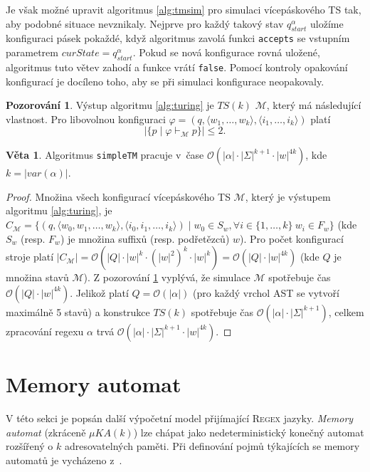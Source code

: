 \documentclass[thesis=B,czech]{FITthesis}[2019/12/23]
\theoremstyle{definition}
\newtheorem{theorem}{Věta}[chapter]
\newtheorem{pozorovani}{Pozorování}[chapter]
\begin{document}
Je však možné upravit algoritmus \ref{alg:tmsim} pro simulaci vícepáskového TS tak, aby podobné situace nevznikaly. Nejprve pro každý takový stav $q_{start}^\alpha$ uložíme konfiguraci pásek pokaždé, když algoritmus zavolá funkci \texttt{accepts} se vstupním parametrem $curState = q_{start}^\alpha$. Pokud se nová konfigurace rovná uložené, algoritmus tuto větev zahodí a funkce vrátí \texttt{false}. Pomocí kontroly opakování konfigurací je docíleno toho, aby se při simulaci konfigurace neopakovaly.  
\begin{pozorovani}\label{poz:out}Výstup algoritmu \ref{alg:turing} je $TS(k)$ $\mathcal{M}$, který má následující vlastnost. Pro libovolnou konfiguraci $\varphi = \left(q, \langle w_1, \dots, w_k\rangle,  \langle i_1, \dots, i_k\rangle\right)$ platí $$|\{p  \mid \varphi \vdash_\mathcal{M} p\}|\le2.$$
\end{pozorovani}
\begin{theorem}Algoritmus \texttt{simpleTM} pracuje v~čase $\mathcal{O}(|\alpha|\cdot|\Sigma|^{k+1}\cdot|w|^{4k})$, kde $k = |var(\alpha)|$. \end{theorem}
\begin{proof}
Množina všech konfigurací vícepáskového TS $\mathcal{M}$, který je výstupem algoritmu \ref{alg:turing}, je $C_{\mathcal{M}}= \{\left(q, \langle w_0, w_1, \dots, w_k\rangle,  \langle i_0, i_1, \dots, i_k\rangle\right) \mid w_0 \in S_w, \forall i \in \{1, \dots, k\} \ w_i \in F_w\}$ (kde $S_w$ (resp. $F_w$) je množina suffixů (resp. podřetězců) $w$). Pro počet konfigurací stroje platí $|C_{\mathcal{M}}| = \mathcal{O}(|Q|\cdot|w|^k \cdot (|w|^2)^k \cdot |w|^{k} ) = \mathcal{O}(|Q|\cdot|w|^{4k})$ (kde $Q$ je množina stavů $\mathcal{M}$).
Z pozorování \ref{poz:out} vyplývá, že simulace $\mathcal{M}$ spotřebuje čas $\mathcal{O}(|Q|\cdot|w|^{4k})$. Jelikož platí $Q=\mathcal{O}(|\alpha|)$ (pro každý vrchol AST se vytvoří maximálně 5 stavů) a konstrukce $TS(k)$ spotřebuje čas $\mathcal{O}(|\alpha|\cdot|\Sigma|^{k+1})$, celkem zpracování regexu $\alpha$ trvá $\mathcal{O}(|\alpha|\cdot|\Sigma|^{k+1}\cdot|w|^{4k})$.
\end{proof}

\section{Memory automat}\label{sec:memory}
V této sekci je popsán další výpočetní model přijímající \textsc{Regex} jazyky. \emph{Memory automat} (zkráceně $\mu KA(k)$) lze chápat jako nedeterministický konečný automat rozšířený o $k$ adresovatelných paměti. Při definování pojmů týkajících se memory automatů je vycházeno z~\cite[sekce 2.2]{schmidref}.
\end{document}
